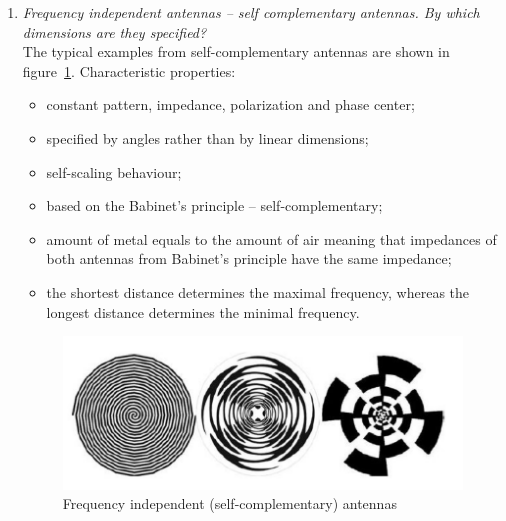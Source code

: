 \documentclass[11pt,a4paper]{article}
\begin{document}
\begin{enumerate}
    \item \emph{Frequency independent antennas -- self complementary antennas. By which dimensions are they specified?}\\
    The typical examples from self-complementary antennas are shown in figure~\ref{fig:self-complementary-antennas}. Characteristic properties:
    \begin{itemize}
        \item constant pattern, impedance, polarization and phase center;
        \item specified by angles rather than by linear dimensions;
        \item self-scaling behaviour;
        \item based on the Babinet's principle -- self-complementary;
        \item amount of metal equals to the amount of air meaning that impedances of both antennas from Babinet's principle have the same impedance;
        \item the shortest distance determines the maximal frequency, whereas the longest distance determines the minimal frequency.
    \end{itemize}
    \begin{figure}[!ht]
        \centering
        \includegraphics[width=.7\textwidth]{src/self-complementary-antennas.png}
        \caption{\label{fig:self-complementary-antennas}Frequency independent (self-complementary) antennas}
    \end{figure}
    

\end{enumerate}
\end{document}
